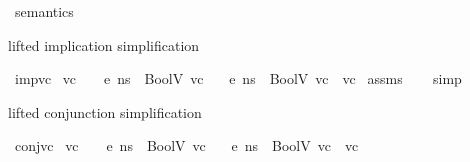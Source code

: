 \begin{isabellebody}
%
\isadelimproof
%
\endisadelimproof
%
\isadelimdocument
%
\endisadelimdocument
%
\isatagdocument
%
\isamarkuptrue%
%
\endisatagdocument
{\isafolddocument}%
%
\isadelimdocument
%
\endisadelimdocument
{}\isamarkupfalse%
\ semantics\ %
\begin{isamarkuptext}%
lifted implication simplification%
\end{isamarkuptext}\isamarkuptrue%
\isamarkupfalse%
\ imp{\isacharunderscore}{\kern0pt}vc{\isacharcolon}{\kern0pt}\isanewline
{}\ {\isachardoublequoteopen}vc{}{\isachardoublequoteclose}\ \ {\isachardoublequoteopen}{\isasymLambda}{\isacharcomma}{\kern0pt}{\isasymGamma}{\isacharcomma}{\kern0pt}{\isasymOmega}\ {\isasymturnstile}\ {\isasymlangle}e{\isacharcomma}{\kern0pt}\ ns{\isasymrangle}\ {\isasymDown}\ BoolV\ vc{\isachardoublequoteclose}\isanewline
{}\ {\isachardoublequoteopen}{\isasymLambda}{\isacharcomma}{\kern0pt}{\isasymGamma}{\isacharcomma}{\kern0pt}{\isasymOmega}\ {\isasymturnstile}\ {\isasymlangle}e{\isacharcomma}{\kern0pt}\ ns{\isasymrangle}\ {\isasymDown}\ BoolV\ {\isacharparenleft}{\kern0pt}vc{}\ {\isasymlongrightarrow}\ vc{\isacharparenright}{\kern0pt}{\isachardoublequoteclose}\isanewline
%
\isadelimproof
%
\endisadelimproof
%
\isatagproof
{}\isamarkupfalse%
\ assms\isanewline
\ \ \isamarkupfalse%
\ simp%
\endisatagproof
{\isafoldproof}%
%
\isadelimproof
%
\endisadelimproof
%
\begin{isamarkuptext}%
lifted conjunction simplification%
\end{isamarkuptext}\isamarkuptrue%
\isamarkupfalse%
\ conj{\isacharunderscore}{\kern0pt}vc{\isacharcolon}{\kern0pt}\isanewline
{}\ {\isachardoublequoteopen}vc{}{\isachardoublequoteclose}\ \ {\isachardoublequoteopen}{\isasymLambda}{\isacharcomma}{\kern0pt}{\isasymGamma}{\isacharcomma}{\kern0pt}{\isasymOmega}\ {\isasymturnstile}\ {\isasymlangle}e{\isacharcomma}{\kern0pt}\ ns{\isasymrangle}\ {\isasymDown}\ BoolV\ vc{\isachardoublequoteclose}\isanewline
{}\ {\isachardoublequoteopen}{\isasymLambda}{\isacharcomma}{\kern0pt}{\isasymGamma}{\isacharcomma}{\kern0pt}{\isasymOmega}\ {\isasymturnstile}\ {\isasymlangle}e{\isacharcomma}{\kern0pt}\ ns{\isasymrangle}\ {\isasymDown}\ BoolV\ {\isacharparenleft}{\kern0pt}vc{}\ {\isasymand}\ vc{\isacharparenright}{\kern0pt}{\isachardoublequoteclose}\isanewline

\end{isabellebody}
